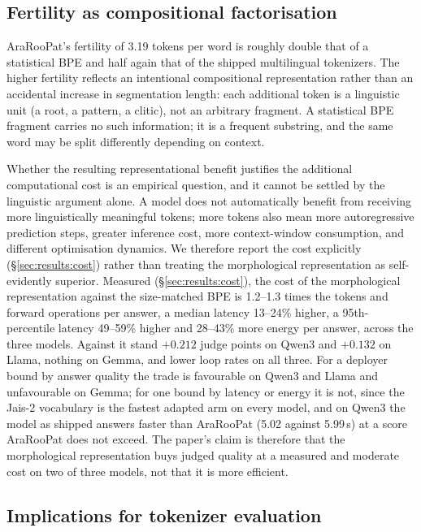 \documentclass[a4paper,fleqn]{cas-sc}
\begin{document}
\subsection{Fertility as compositional factorisation}
\label{sec:discussion:fertility}

AraRooPat's fertility of 3.19 tokens per word is roughly double that of a statistical BPE and half again that of the shipped multilingual tokenizers. The higher fertility reflects an intentional compositional representation rather than an accidental increase in segmentation length: each additional token is a linguistic unit (a root, a pattern, a clitic), not an arbitrary fragment. A statistical BPE fragment carries no such information; it is a frequent substring, and the same word may be split differently depending on context.

Whether the resulting representational benefit justifies the additional computational cost is an empirical question, and it cannot be settled by the linguistic argument alone. A model does not automatically benefit from receiving more linguistically meaningful tokens; more tokens also mean more autoregressive prediction steps, greater inference cost, more context-window consumption, and different optimisation dynamics. We therefore report the cost explicitly (\S\ref{sec:results:cost}) rather than treating the morphological representation as self-evidently superior.
Measured (\S\ref{sec:results:cost}), the cost of the morphological representation against the size-matched BPE is 1.2--1.3 times the tokens and forward operations per answer, a median latency 13--24\% higher, a 95th-percentile latency 49--59\% higher and 28--43\% more energy per answer, across the three models. Against it stand $+0.212$ judge points on Qwen3 and $+0.132$ on Llama, nothing on Gemma, and lower loop rates on all three. For a deployer bound by answer quality the trade is favourable on Qwen3 and Llama and unfavourable on Gemma; for one bound by latency or energy it is not, since the Jais-2 vocabulary is the fastest adapted arm on every model, and on Qwen3 the model as shipped answers faster than AraRooPat (5.02 against 5.99\,s) at a score AraRooPat does not exceed. The paper's claim is therefore that the morphological representation buys judged quality at a measured and moderate cost on two of three models, not that it is more efficient.

\subsection{Implications for tokenizer evaluation}
\label{sec:discussion:eval}
\end{document}
